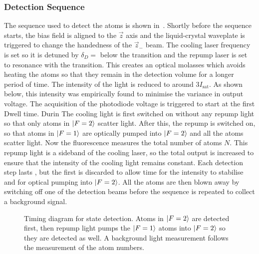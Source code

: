 \subsubsection{Detection Sequence}\label{subsec:detection_sequence}
The sequence used to detect the atoms is shown
in~. Shortly before the sequence starts, the
bias field is aligned to the \(\vec{z}\) axis and the liquid-crystal
waveplate is triggered to change the handedness of the \(\vec{z}_-\)
beam. The cooling laser frequency is set so it is detuned by
\(\delta_D =\) 
below the  transition and the repump laser is set to
resonance with the  transition. This creates an optical
molasses which avoids heating the atoms so that they remain in the
detection volume for a longer period of time. The intensity of the
light is reduced to around \(3 I_\text{sat}\). As shown below, this
intensity was empirically found to minimise the variance in output
voltage. The acquisition of the photodiode voltage is
triggered to start at the first Dwell time. Durin The cooling light is first
switched on without any repump light so that only atoms in \(\ket{F=2}\) scatter light. After this, the repump
is switched on, so that atoms in \(\ket{F=1}\) are optically pumped
into \(\ket{F=2}\) and all the atoms scatter light. Now the
fluorescence measures the total number of atoms $N$. This repump light is a
sideband of the cooling laser, so the total output is increased
to ensure that the intensity of the cooling light remains constant.
Each detection step lasts , but the
first  is discarded to allow time for the
intensity to stabilise and for optical pumping into \(\ket{F=2}\).
All the atoms are then blown away by switching off one of the detection
beams before the sequence is repeated to collect a
background signal.
\begin{figure}[!htbp] 
  \centering
  \fontsize{14pt}{14pt}
  \resizebox{0.8\textwidth}{!}{} 
  \caption[State detection sequence timing]{Timing diagram for state
    detection. Atoms in \(\ket{F=2}\) are detected first, then repump
    light pumps the \(\ket{F=1}\) atoms into $\ket{F=2}$ so they are detected as well. A
background light measurement follows the measurement of the atom
numbers.}
	\label{fig:detection} 
\end{figure}
